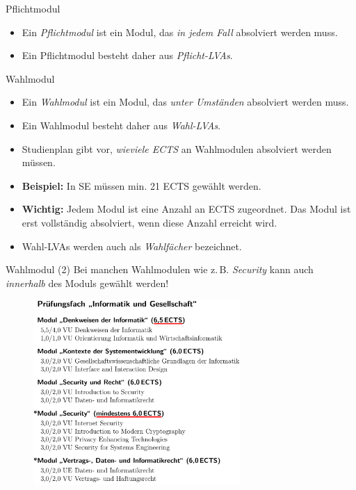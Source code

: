 \documentclass{beamer}
\begin{document}
\begin{frame}{Pflichtmodul}
    \begin{itemize}
        \item Ein \textit{Pflichtmodul} ist ein Modul, das
              \textit{in jedem Fall} absolviert werden muss.
        \item Ein Pflichtmodul besteht daher aus \textit{Pflicht-LVAs}.
    \end{itemize}
\end{frame}

\begin{frame}{Wahlmodul}
    \begin{itemize}
        \item Ein \textit{Wahlmodul} ist ein Modul, das
              \textit{unter Umständen} absolviert werden muss.
        \item Ein Wahlmodul besteht daher aus \textit{Wahl-LVAs}.
        \item Studienplan gibt vor, \textit{wieviele ECTS} an Wahlmodulen
              absolviert werden müssen.
        \item \textbf{Beispiel:} In SE müssen min. 21 ECTS gewählt werden.
        \item \textbf{Wichtig:} Jedem Modul ist eine Anzahl an ECTS
              zugeordnet. Das Modul ist erst vollständig absolviert, wenn
              diese Anzahl erreicht wird.
        \item Wahl-LVAs werden auch als \textit{Wahlfächer} bezeichnet.
    \end{itemize}
\end{frame}

\begin{frame}{Wahlmodul (2)}
    Bei manchen Wahlmodulen wie z.\,B. \textit{Security} kann auch
    \textit{innerhalb} des Moduls gewählt werden!
    \begin{figure}[htp]
        \includegraphics[width=0.7\textwidth]{pruefungsfach2.png}
    \end{figure}
\end{frame}
\end{document}
